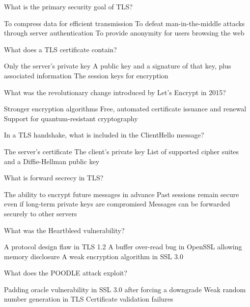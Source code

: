 \documentclass[10pt,a4paper,american]{exam}
\begin{document}
\begin{questions}
	\question What is the primary security goal of TLS?
	\begin{randomizechoices}
		\choice To compress data for efficient transmission
		\CorrectChoice To defeat man-in-the-middle attacks through server authentication
		\choice To provide anonymity for users browsing the web
	\end{randomizechoices}

	\question What does a TLS certificate contain?
	\begin{randomizechoices}
		\choice Only the server's private key
		\CorrectChoice A public key and a signature of that key, plus associated information
		\choice The session keys for encryption
	\end{randomizechoices}

	\question What was the revolutionary change introduced by Let's Encrypt in 2015?
	\begin{randomizechoices}
		\choice Stronger encryption algorithms
		\CorrectChoice Free, automated certificate issuance and renewal
		\choice Support for quantum-resistant cryptography
	\end{randomizechoices}

	\question In a TLS handshake, what is included in the ClientHello message?
	\begin{randomizechoices}
		\choice The server's certificate
		\choice The client's private key
		\CorrectChoice List of supported cipher suites and a Diffie-Hellman public key
	\end{randomizechoices}

	\question What is forward secrecy in TLS?
	\begin{randomizechoices}
		\choice The ability to encrypt future messages in advance
		\CorrectChoice Past sessions remain secure even if long-term private keys are compromised
		\choice Messages can be forwarded securely to other servers
	\end{randomizechoices}

	\question What was the Heartbleed vulnerability?
	\begin{randomizechoices}
		\choice A protocol design flaw in TLS 1.2
		\CorrectChoice A buffer over-read bug in OpenSSL allowing memory disclosure
		\choice A weak encryption algorithm in SSL 3.0
	\end{randomizechoices}

	\question What does the POODLE attack exploit?
	\begin{randomizechoices}
		\CorrectChoice Padding oracle vulnerability in SSL 3.0 after forcing a downgrade
		\choice Weak random number generation in TLS
		\choice Certificate validation failures
	\end{randomizechoices}


\end{questions}
\end{document}
